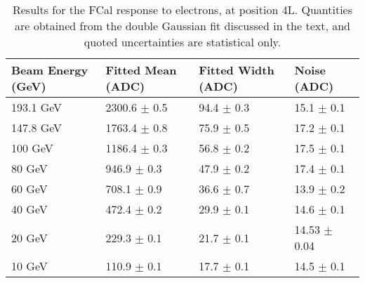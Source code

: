 \begin{table}[p]
\begin{center}
\begin{tabular}{|l|l|l|l|}
\hline
Beam Energy (GeV) & Fitted Mean (ADC)& Fitted Width (ADC)& Noise (ADC) \\
\hline
193.1 GeV  &  2300.6 $\pm$     0.5 &    94.4 $\pm$     0.3 &    15.1 $\pm$     0.1 \\
147.8 GeV  &  1763.4 $\pm$     0.8 &    75.9 $\pm$     0.5 &    17.2 $\pm$     0.1 \\
100 GeV  &  1186.4 $\pm$     0.3 &    56.8 $\pm$     0.2 &    17.5 $\pm$     0.1 \\
80 GeV  &   946.9 $\pm$     0.3 &    47.9 $\pm$     0.2 &    17.4 $\pm$     0.1 \\
60 GeV  &   708.1 $\pm$     0.9 &    36.6 $\pm$     0.7 &    13.9 $\pm$     0.2 \\
40 GeV  &   472.4 $\pm$     0.2 &    29.9 $\pm$     0.1 &    14.6 $\pm$     0.1 \\
20 GeV  &   229.3 $\pm$     0.1 &    21.7 $\pm$     0.1 &    14.53 $\pm$     0.04 \\
10 GeV  &   110.9 $\pm$     0.1 &    17.7 $\pm$     0.1 &    14.5 $\pm$     0.1 \\
\hline
\end{tabular}
\end{center}
\caption[Results for the FCal response to electrons, 4L]{Results for the FCal response to electrons, at position 4L. Quantities are obtained from the double Gaussian fit discussed in the text, and quoted uncertainties are statistical only.}
\label{TBres_table_elec_4L}
\end{table}

